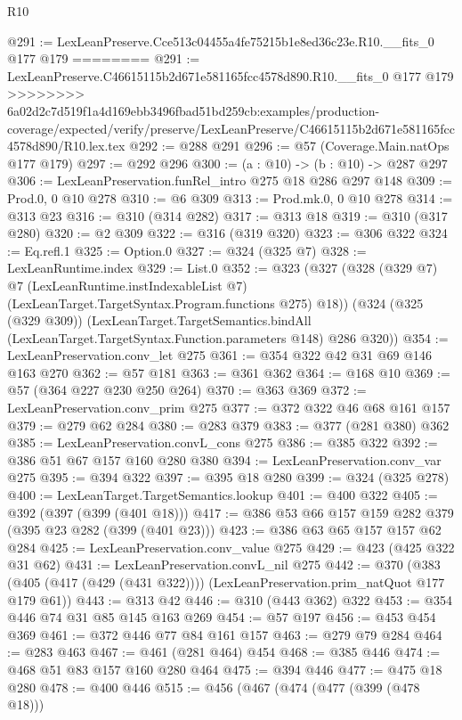\begin{lexlean}{R10}
\begin{coremodule}
{{{{{@291 := LexLeanPreserve.Cce513c04455a4fe75215b1e8ed36c23e.R10.__fits_0 @177 @179
========
@291 := LexLeanPreserve.C46615115b2d671e581165fcc4578d890.R10.__fits_0 @177 @179
>>>>>>>> 6a02d2c7d519f1a4d169ebb3496fbad51bd259cb:examples/production-coverage/expected/verify/preserve/LexLeanPreserve/C46615115b2d671e581165fcc4578d890/R10.lex.tex
@292 := @288 @291
@296 := @57 (Coverage.Main.natOps @177 @179)
@297 := @292 @296
@300 := (a : @10) -> (b : @10) -> @287 @297
@306 := LexLeanPreservation.funRel_intro @275 @18 @286 @297 @148
@309 := Prod.{0, 0} @10 @278
@310 := @6 @309
@313 := Prod.mk.{0, 0} @10 @278
@314 := @313 @23
@316 := @310 (@314 @282)
@317 := @313 @18
@319 := @310 (@317 @280)
@320 := @2 @309
@322 := @316 (@319 @320)
@323 := @306 @322
@324 := Eq.refl.{1}
@325 := Option.{0}
@327 := @324 (@325 @7)
@328 := LexLeanRuntime.index
@329 := List.{0}
@352 := @323
    (@327
      (@328
        (@329 @7)
        @7
        (LexLeanRuntime.instIndexableList @7)
        (LexLeanTarget.TargetSyntax.Program.functions @275)
        @18))
    (@324
      (@325 (@329 @309))
      (LexLeanTarget.TargetSemantics.bindAll
        (LexLeanTarget.TargetSyntax.Function.parameters @148)
        @286
        @320))
@354 := LexLeanPreservation.conv_let @275
@361 := @354 @322 @42 @31 @69 @146 @163 @270
@362 := @57 @181
@363 := @361 @362
@364 := @168 @10
@369 := @57 (@364 @227 @230 @250 @264)
@370 := @363 @369
@372 := LexLeanPreservation.conv_prim @275
@377 := @372 @322 @46 @68 @161 @157
@379 := @279 @62 @284
@380 := @283 @379
@383 := @377 (@281 @380) @362
@385 := LexLeanPreservation.convL_cons @275
@386 := @385 @322
@392 := @386 @51 @67 @157 @160 @280 @380
@394 := LexLeanPreservation.conv_var @275
@395 := @394 @322
@397 := @395 @18 @280
@399 := @324 (@325 @278)
@400 := LexLeanTarget.TargetSemantics.lookup
@401 := @400 @322
@405 := @392 (@397 (@399 (@401 @18)))
@417 := @386 @53 @66 @157 @159 @282 @379 (@395 @23 @282 (@399 (@401 @23)))
@423 := @386 @63 @65 @157 @157 @62 @284
@425 := LexLeanPreservation.conv_value @275
@429 := @423 (@425 @322 @31 @62)
@431 := LexLeanPreservation.convL_nil @275
@442 := @370
    (@383 (@405 (@417 (@429 (@431 @322)))) (LexLeanPreservation.prim_natQuot @177 @179 @61))
@443 := @313 @42
@446 := @310 (@443 @362) @322
@453 := @354 @446 @74 @31 @85 @145 @163 @269
@454 := @57 @197
@456 := @453 @454 @369
@461 := @372 @446 @77 @84 @161 @157
@463 := @279 @79 @284
@464 := @283 @463
@467 := @461 (@281 @464) @454
@468 := @385 @446
@474 := @468 @51 @83 @157 @160 @280 @464
@475 := @394 @446
@477 := @475 @18 @280
@478 := @400 @446
@515 := @456
    (@467
      (@474
        (@477 (@399 (@478 @18)))
}}}}}
\end{coremodule}
\end{lexlean}
